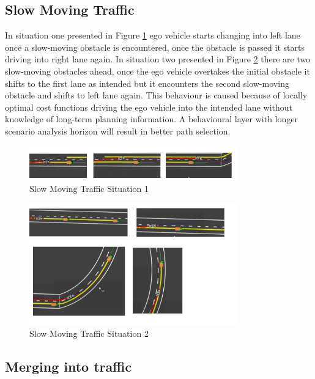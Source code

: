 \subsection{Slow Moving Traffic}
In situation one presented in Figure \ref{slow_moving_1} ego vehicle starts changing into left lane once a slow-moving obstacle is encountered, once the obstacle is passed it starts driving into right lane again. In situation two presented in Figure \ref{slow_moving_2} there are two slow-moving obstacles ahead, once the ego vehicle overtakes the initial obstacle it shifts to the first lane as intended but it encounters the second slow-moving obstacle and shifts to left lane again. This behaviour is caused because of locally optimal cost functions driving the ego vehicle into the intended lane without knowledge of long-term planning information. A behavioural layer with longer scenario analysis horizon will result in better path selection.
\begin{figure}[h]
    \centering
    \includegraphics[width=0.8\textwidth]{Images/evaluation/slow_moving1.jpg}
    \caption{Slow Moving Traffic Situation 1}
    \label{slow_moving_1}
\end{figure}

\begin{figure}[h]
    \centering
    \includegraphics[width=0.8\textwidth]{Images/evaluation/slow_moving2.jpg}
    \caption{Slow Moving Traffic Situation 2}
    \label{slow_moving_2}
\end{figure}

\subsection{Merging into traffic}

